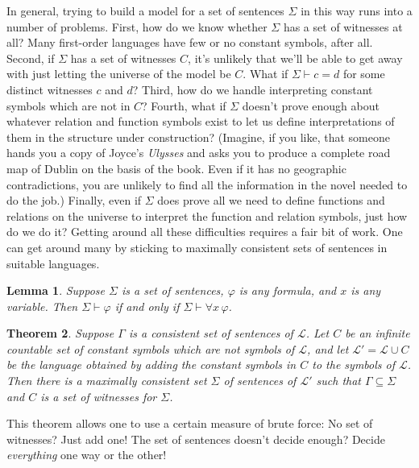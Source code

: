 \documentclass[12pt]{amsbook}
\newcommand{\proves}{\vdash}
\theoremstyle{plain}
\newtheorem{thm}{Theorem}[chapter]
\newtheorem{lem}[thm]{Lemma}
\theoremstyle{definition}
\theoremstyle{remark}
\begin{document}
In general,  trying to build a model for a set of sentences $\Sigma$ in this way runs into a number of problems.  First,  how do we know whether $\Sigma$ has a set of witnesses at all?  Many first-order languages have few or no constant symbols,  after all.  Second,  if $\Sigma$ has a set of witnesses $C$,  it's unlikely that we'll be able to get away with just letting the universe of the model be $C$.  What if  $\Sigma \proves c = d$ for some distinct witnesses $c$ and $d$?   Third,  how do we handle interpreting constant symbols which are not in $C$?  Fourth,  what if $\Sigma$ doesn't prove enough about whatever relation and function symbols exist to let us define interpretations of them in the structure under construction?  (Imagine,  if you like,  that someone hands you a copy of Joyce's {\em Ulysses\/} and asks you to produce a complete road map of Dublin on the basis of the book.  Even if it has no geographic contradictions,  you are unlikely to find all the information in the novel needed to do the job.)  Finally,  even if $\Sigma$ does prove all we need to define functions and relations on the universe to interpret the function and relation symbols,  just how do we do it?   Getting around all these difficulties requires a fair bit of work.  One can get around many by sticking to maximally consistent sets of sentences in suitable languages. 

\begin{lem} \label{l:eight12}
Suppose $\Sigma$ is a set of sentences,  $\varphi$ is any formula,  and $x$ is any variable.  Then $\Sigma \proves \varphi$ if and only if $\Sigma \proves \forall x\, \varphi$.
\end{lem}

\begin{thm} \label{t:exmcw}
Suppose $\Gamma$ is a consistent set of sentences of $\mathcal{L}$.  Let $C$ be an infinite countable set of constant symbols which are {\em not\/} symbols of $\mathcal{L}$,  and let $\mathcal{L}' = \mathcal{L} \cup C$ be the language obtained by adding the constant symbols in $C$ to the symbols of $\mathcal{L}$.  Then there is a maximally consistent set $\Sigma$ of sentences  of $\mathcal{L}'$ such that $\Gamma \subseteq \Sigma$ and $C$ is a set of witnesses for $\Sigma$.  
\end{thm}

This theorem allows one to use a certain measure of brute force:  No set of witnesses?  Just add one!  The set of sentences doesn't decide enough?  Decide {\em everything\/} one way or the other!
\end{document}
